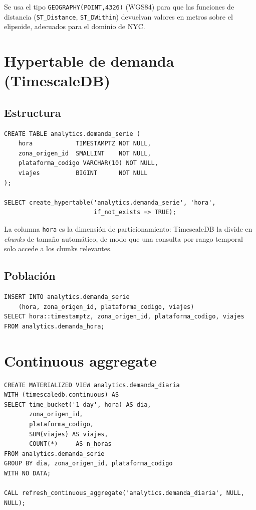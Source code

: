 \documentclass[11pt,a4paper]{article}
\begin{document}
Se usa el tipo \texttt{GEOGRAPHY(POINT,4326)} (WGS84) para que las funciones de distancia
(\texttt{ST\_Distance}, \texttt{ST\_DWithin}) devuelvan valores en metros sobre el elipsoide,
adecuados para el dominio de NYC.

\section{Hypertable de demanda (TimescaleDB)}

\subsection{Estructura}
\begin{lstlisting}
CREATE TABLE analytics.demanda_serie (
    hora            TIMESTAMPTZ NOT NULL,
    zona_origen_id  SMALLINT    NOT NULL,
    plataforma_codigo VARCHAR(10) NOT NULL,
    viajes          BIGINT      NOT NULL
);

SELECT create_hypertable('analytics.demanda_serie', 'hora',
                         if_not_exists => TRUE);
\end{lstlisting}

La columna \texttt{hora} es la dimensión de particionamiento: TimescaleDB la divide en
\emph{chunks} de tamaño automático, de modo que una consulta por rango temporal solo accede
a los chunks relevantes.

\subsection{Población}
\begin{lstlisting}
INSERT INTO analytics.demanda_serie
    (hora, zona_origen_id, plataforma_codigo, viajes)
SELECT hora::timestamptz, zona_origen_id, plataforma_codigo, viajes
FROM analytics.demanda_hora;
\end{lstlisting}

\section{Continuous aggregate}

\begin{lstlisting}
CREATE MATERIALIZED VIEW analytics.demanda_diaria
WITH (timescaledb.continuous) AS
SELECT time_bucket('1 day', hora) AS dia,
       zona_origen_id,
       plataforma_codigo,
       SUM(viajes) AS viajes,
       COUNT(*)     AS n_horas
FROM analytics.demanda_serie
GROUP BY dia, zona_origen_id, plataforma_codigo
WITH NO DATA;

CALL refresh_continuous_aggregate('analytics.demanda_diaria', NULL, NULL);
\end{lstlisting}
\end{document}
